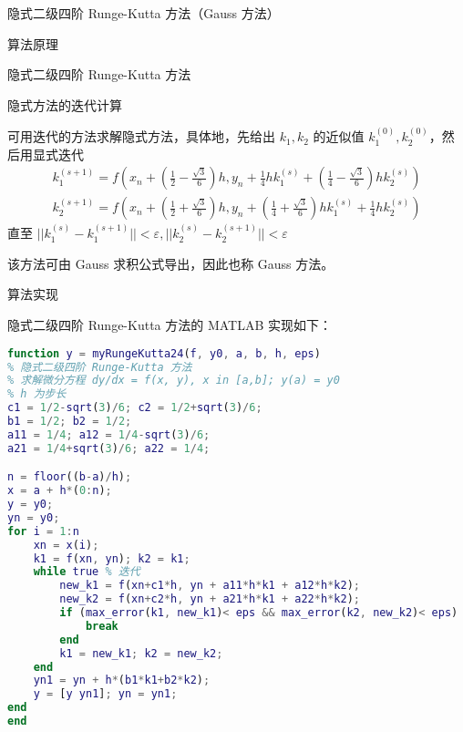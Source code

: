 \documentclass[a4paper]{article}
\begin{document}
\begin{multicols}{2}
\begin{section}{隐式二级四阶 Runge-Kutta 方法（Gauss 方法）}
\begin{subsection}{算法原理}
\begin{subsubsection}{隐式二级四阶 Runge-Kutta 方法}
			
		\end{subsubsection}

		\begin{subsubsection}{隐式方法的迭代计算}
			
			可用迭代的方法求解隐式方法，具体地，先给出 $k_1, k_2$ 的近似值 $k_1^{(0)}, k_2^{(0)}$，然后用显式迭代 $$\begin{array}{l}{k_{1}^{(s+1)}=f\left(x_{n}+\left(\frac{1}{2}-\frac{\sqrt{3}}{6}\right) h, y_{n}+\frac{1}{4} h k_{1}^{(s)}+\left(\frac{1}{4}-\frac{\sqrt{3}}{6}\right) h k_{2}^{(s)}\right)} \\ {k_{2}^{(s+1)}=f\left(x_{n}+\left(\frac{1}{2}+\frac{\sqrt{3}}{6}\right) h, y_{n}+\left(\frac{1}{4}+\frac{\sqrt{3}}{6}\right) h k_{1}^{(s)}+\frac{1}{4} h k_{2}^{(s)}\right)}\end{array}$$ 直至 $||k_1^{(s)} -k_1^{(s+1)}||<\varepsilon, ||k_2^{(s)} -k_2^{(s+1)}||<\varepsilon$
			
			该方法可由 Gauss 求积公式导出，因此也称 Gauss 方法。
			
		\end{subsubsection}
		
	\end{subsection}
	
	\begin{subsection}{算法实现}
		
		隐式二级四阶 Runge-Kutta 方法的 MATLAB 实现如下：
		
		\begin{lstlisting}[language=Matlab]
function y = myRungeKutta24(f, y0, a, b, h, eps)
% 隐式二级四阶 Runge-Kutta 方法
% 求解微分方程 dy/dx = f(x, y), x in [a,b]; y(a) = y0
% h 为步长
c1 = 1/2-sqrt(3)/6; c2 = 1/2+sqrt(3)/6; 
b1 = 1/2; b2 = 1/2;
a11 = 1/4; a12 = 1/4-sqrt(3)/6;
a21 = 1/4+sqrt(3)/6; a22 = 1/4;

n = floor((b-a)/h);
x = a + h*(0:n); 
y = y0; 
yn = y0;
for i = 1:n
    xn = x(i);
    k1 = f(xn, yn); k2 = k1;
    while true % 迭代
        new_k1 = f(xn+c1*h, yn + a11*h*k1 + a12*h*k2);
        new_k2 = f(xn+c2*h, yn + a21*h*k1 + a22*h*k2);
        if (max_error(k1, new_k1)< eps && max_error(k2, new_k2)< eps)
            break
        end
        k1 = new_k1; k2 = new_k2;
    end
    yn1 = yn + h*(b1*k1+b2*k2);
    y = [y yn1]; yn = yn1;
end
end
		\end{lstlisting}
		
	\end{subsection}
	
\end{section}


\end{multicols}
\end{document}
